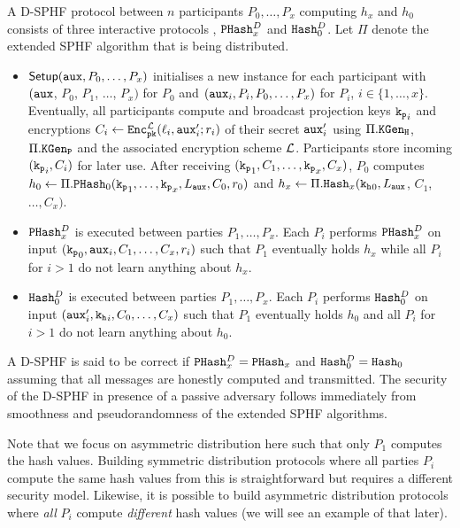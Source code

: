 A \ac{D-SPHF} protocol between $n$ participants $P_0,\dots,P_x$ computing $h_x$ and $h_0$ consists of three interactive protocols \Setup, $\mathtt{PHash}_x^D$ and $\mathtt{Hash}_0^D$.
Let $\Pi$ denote the extended \ac{SPHF} algorithm that is being distributed.
\begin{itemize}
	\item $\mathsf{Setup}(\mathtt{aux},P_0,\dots,P_x)$ initialises a new instance for each participant with $(\mathtt{aux}$, $P_0$, $P_1$, $\dots$, $P_x)$ for $P_0$ and $(\mathtt{aux}_i,P_i,P_0,\dots,P_x)$ for $P_i$, $i\in\{1,\dots,x\}$.
	Eventually, all participants compute and broadcast projection keys $\mathtt{k_p}_i$ and encryptions $C_i\gets\mathtt{Enc}_{\mathtt{pk}}^{\mathcal{L}}(\ell_i,\mathtt{aux}'_i;r_i)$ of their secret $\mathtt{aux}'_i$ using $\Pi.\mathtt{KGen_H}$, $\Pi.\mathtt{KGen_P}$ and the associated encryption scheme $\mathcal{L}$.
	Participants store incoming $(\mathtt{k_p}_i,C_i)$ for later use.
	After receiving $(\mathtt{k_p}_1,C_1,\dots,\mathtt{k_p}_x,C_x)$, $P_0$ computes $h_0\gets\Pi.\mathtt{PHash}_0(\mathtt{k_p}_1,\dots,\mathtt{k_p}_x,L_\mathtt{aux},C_0,r_0)$ and $h_x\gets\Pi.\mathtt{Hash}_x(\mathtt{k_h}_0,L_\mathtt{aux}$, $C_1$, $\dots,C_x)$.

	\item $\mathtt{PHash}_x^D$ is executed between parties $P_1,\dots,P_x$.
	Each $P_i$ performs $\mathtt{PHash}_x^D$ on input $(\mathtt{k_p}_0,\mathtt{aux}_i,\allowbreak C_1,\dots,C_x,r_i)$ such that $P_1$ eventually holds $h_x$ while all $P_i$ for $i>1$ do not learn anything about $h_x$.
	
	\item $\mathtt{Hash}_0^D$ is executed between parties $P_1,\dots,P_x$.
	Each $P_i$ performs $\mathtt{Hash}_0^D$ on input $(\mathtt{aux}'_i,\mathtt{k_h}_i,\allowbreak C_0,\dots,C_x)$ such that $P_1$ eventually holds $h_0$ and all $P_i$ for $i>1$ do not learn anything about $h_0$.
\end{itemize}

\noindent
A \ac{D-SPHF} is said to be correct if $\mathtt{PHash}_x^D=\mathtt{PHash}_x$ and $\mathtt{Hash}_0^D=\mathtt{Hash}_0$ assuming that all messages are honestly computed and transmitted.
The security of the \ac{D-SPHF} in presence of a passive adversary follows immediately from smoothness and pseudorandomness of the extended \ac{SPHF} algorithms.

\begin{remark}
Note that we focus on asymmetric distribution here such that only $P_1$ computes the hash values.
Building symmetric distribution protocols where all parties $P_i$ compute the same hash values from this is straightforward but requires a different security model.
Likewise, it is possible to build asymmetric distribution protocols where \emph{all} $P_i$ compute \emph{different} hash values (we will see an example of that later).
\end{remark}


